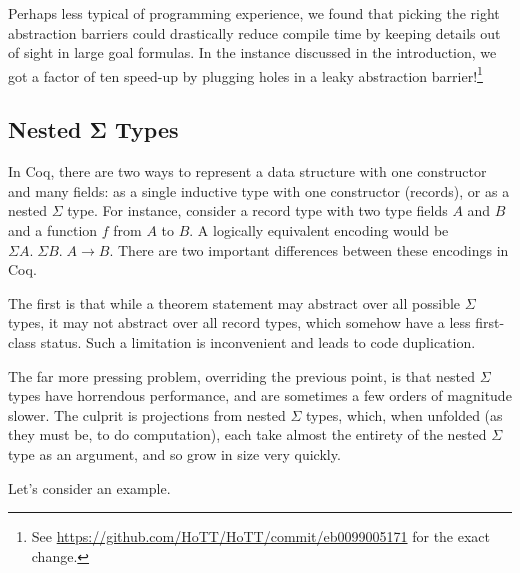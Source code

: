     Perhaps less typical of programming experience, we found that picking the right abstraction barriers could drastically reduce compile time by keeping details out of sight in large goal formulas.
    In the instance discussed in the introduction, we got a factor of ten speed-up by plugging holes in a leaky abstraction barrier!\footnote{See \url{https://github.com/HoTT/HoTT/commit/eb0099005171} for the exact change.}

\subsection{Nested Σ Types} \label{sec:nested-sigma-types}
  In Coq, there are two ways to represent a data structure with one constructor and many fields:
  as a single inductive type with one constructor (records), or as a nested $\Sigma$ type.
  For instance, consider a record type with two type fields $A$ and $B$ and a function $f$ from $A$ to $B$.
  A logically equivalent encoding would be $\Sigma A. \; \Sigma B. \; A \to B$.
  There are two important differences between these encodings in Coq.
  
  \label{sec:prim-record-proj}
  The first is that while a theorem statement may abstract over all possible $\Sigma$ types, it may not abstract over all record types, which somehow have a less first-class status.
  Such a limitation is inconvenient and leads to code duplication.
  
  The far more pressing problem, overriding the previous point, is that nested $\Sigma$ types have horrendous performance, and are sometimes a few orders of magnitude slower.
  The culprit is projections from nested $\Sigma$ types, which, when unfolded (as they must be, to do computation), each take almost the entirety of the nested $\Sigma$ type as an argument, and so grow in size very quickly.
  
  Let's consider an example.
  
